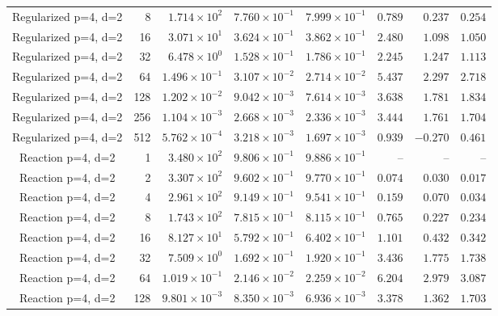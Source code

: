 \begin{longtable}{@{}crrrrrrr@{}}
Regularized p=4, d=2 & 8 & $1.714\!\times\!10^{2}$ & $7.760\!\times\!10^{-1}$ & $7.999\!\times\!10^{-1}$ & $0.789$ & $0.237$ & $0.254$ \\
Regularized p=4, d=2 & 16 & $3.071\!\times\!10^{1}$ & $3.624\!\times\!10^{-1}$ & $3.862\!\times\!10^{-1}$ & $2.480$ & $1.098$ & $1.050$ \\
Regularized p=4, d=2 & 32 & $6.478\!\times\!10^{0}$ & $1.528\!\times\!10^{-1}$ & $1.786\!\times\!10^{-1}$ & $2.245$ & $1.247$ & $1.113$ \\
Regularized p=4, d=2 & 64 & $1.496\!\times\!10^{-1}$ & $3.107\!\times\!10^{-2}$ & $2.714\!\times\!10^{-2}$ & $5.437$ & $2.297$ & $2.718$ \\
Regularized p=4, d=2 & 128 & $1.202\!\times\!10^{-2}$ & $9.042\!\times\!10^{-3}$ & $7.614\!\times\!10^{-3}$ & $3.638$ & $1.781$ & $1.834$ \\
Regularized p=4, d=2 & 256 & $1.104\!\times\!10^{-3}$ & $2.668\!\times\!10^{-3}$ & $2.336\!\times\!10^{-3}$ & $3.444$ & $1.761$ & $1.704$ \\
Regularized p=4, d=2 & 512 & $5.762\!\times\!10^{-4}$ & $3.218\!\times\!10^{-3}$ & $1.697\!\times\!10^{-3}$ & $0.939$ & $-0.270$ & $0.461$ \\
Reaction p=4, d=2 & 1 & $3.480\!\times\!10^{2}$ & $9.806\!\times\!10^{-1}$ & $9.886\!\times\!10^{-1}$ & -- & -- & -- \\
Reaction p=4, d=2 & 2 & $3.307\!\times\!10^{2}$ & $9.602\!\times\!10^{-1}$ & $9.770\!\times\!10^{-1}$ & $0.074$ & $0.030$ & $0.017$ \\
Reaction p=4, d=2 & 4 & $2.961\!\times\!10^{2}$ & $9.149\!\times\!10^{-1}$ & $9.541\!\times\!10^{-1}$ & $0.159$ & $0.070$ & $0.034$ \\
Reaction p=4, d=2 & 8 & $1.743\!\times\!10^{2}$ & $7.815\!\times\!10^{-1}$ & $8.115\!\times\!10^{-1}$ & $0.765$ & $0.227$ & $0.234$ \\
Reaction p=4, d=2 & 16 & $8.127\!\times\!10^{1}$ & $5.792\!\times\!10^{-1}$ & $6.402\!\times\!10^{-1}$ & $1.101$ & $0.432$ & $0.342$ \\
Reaction p=4, d=2 & 32 & $7.509\!\times\!10^{0}$ & $1.692\!\times\!10^{-1}$ & $1.920\!\times\!10^{-1}$ & $3.436$ & $1.775$ & $1.738$ \\
Reaction p=4, d=2 & 64 & $1.019\!\times\!10^{-1}$ & $2.146\!\times\!10^{-2}$ & $2.259\!\times\!10^{-2}$ & $6.204$ & $2.979$ & $3.087$ \\
Reaction p=4, d=2 & 128 & $9.801\!\times\!10^{-3}$ & $8.350\!\times\!10^{-3}$ & $6.936\!\times\!10^{-3}$ & $3.378$ & $1.362$ & $1.703$ \\

\end{longtable}
